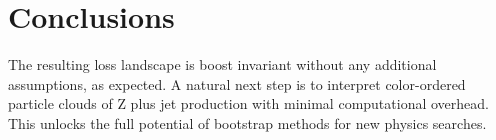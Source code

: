 \section{Conclusions}\label{sec:conclusions}

The resulting loss landscape is boost invariant without any additional
assumptions, as expected. A natural next step is to interpret
color-ordered particle clouds of Z plus jet production with minimal
computational overhead. This unlocks the full potential of bootstrap
methods for new physics searches.

